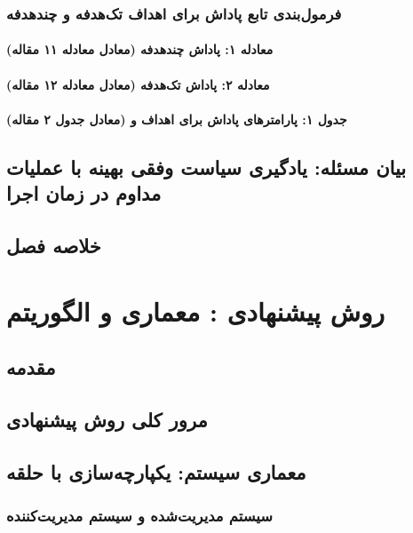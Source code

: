 \documentclass[oneside,openany,phd]{TMU-Thesis}
\begin{document}
\subsection{فرمول‌بندی تابع پاداش برای اهداف تک‌هدفه و چندهدفه}
\subsubsection{معادله ۱: پاداش چندهدفه (معادل معادله ۱۱ مقاله)}
\subsubsection{معادله ۲: پاداش تک‌هدفه (معادل معادله ۱۲ مقاله)}
\subsubsection{جدول ۱: پارامترهای پاداش برای اهداف  و  (معادل جدول ۲ مقاله)}

\section{بیان مسئله: یادگیری سیاست وفقی بهینه با عملیات مداوم در زمان اجرا}

\section{خلاصه فصل}

\newpage

\chapter{روش پیشنهادی : معماری و الگوریتم}
\section{مقدمه}

\section{مرور کلی روش پیشنهادی}

\section{معماری سیستم: یکپارچه‌سازی  با حلقه }
\subsection{سیستم مدیریت‌شده و سیستم مدیریت‌کننده}
\end{document}
